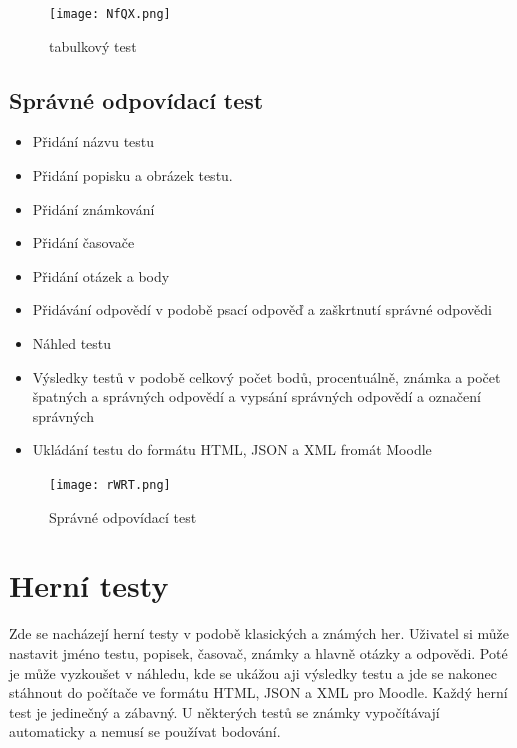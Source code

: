 \documentclass[12pt, a4paper, twoside, openright]{report}
\begin{document}
    \begin{figure}[h]
		\centering
		\texttt{[image: NfQX.png]}
            \caption{tabulkový test}
		\label{fig:architecture}
	\end{figure}

	\section{Správné odpovídací test}

	\begin{itemize}
		\item Přidání názvu testu
		\item Přidání popisku a obrázek testu.
		\item Přidání známkování
		\item Přidání časovače
            \item Přidání otázek a body
            \item Přidávání odpovědí v podobě psací odpověď a zaškrtnutí správné odpovědi
            \item Náhled testu
            \item Výsledky testů v podobě celkový počet bodů, procentuálně, známka a počet špatných a správných odpovědí a vypsání správných odpovědí a označení správných
            \item Ukládání testu do formátu HTML, JSON a XML fromát Moodle
	\end{itemize}

    \begin{figure}[h]
		\centering
		\texttt{[image: rWRT.png]}
		\caption{Správné odpovídací test}
		\label{fig:architecture}
	\end{figure}
		

    \chapter{Herní testy}
    Zde se nacházejí herní testy v podobě klasických a známých her. Uživatel si může nastavit jméno testu, popisek, časovač, známky a hlavně otázky a odpovědi. Poté je může vyzkoušet v náhledu, kde se ukážou aji výsledky testu a jde se nakonec stáhnout do počítače ve formátu HTML, JSON a XML pro Moodle. Každý herní test je jedinečný a zábavný. U některých testů se známky vypočítávají automaticky a nemusí se používat bodování.
\end{document}
